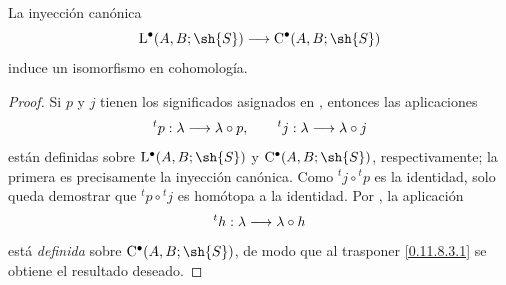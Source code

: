 \documentclass[oneside]{amsart}
\makeatletter
\newcommand{\ega@arrow}[2]{\mathchoice{#1}{#2}{#2}{#2}}
\renewcommand{\to}{\ega@arrow{\longrightarrow}{\rightarrow}}
\let\EGAOriginalLabel\label
\renewcommand{\label}[1]{\phantomsection\EGAOriginalLabel{#1}}
\makeatother
\begin{document}
\begin{proposition}[11.8.5]
\label{0.11.8.5}
La inyección canónica
\[
  \mathrm{L}^\bullet(A,B;\sh{S})
  \longrightarrow
  \mathrm{C}^\bullet(A,B;\sh{S})
\]
induce un isomorfismo en cohomología.
\end{proposition}

\begin{proof}
Si $p$ y $j$ tienen los significados asignados en , entonces
las aplicaciones
\[
  {}^tp:\lambda\to\lambda\circ p,
  \qquad
  {}^tj:\lambda\to\lambda\circ j
\]
están definidas sobre $\mathrm{L}^\bullet(A,B;\sh{S})$ y
$\mathrm{C}^\bullet(A,B;\sh{S})$, respectivamente; la primera es precisamente
la inyección canónica.
Como ${}^tj\circ{}^tp$ es la identidad, solo queda demostrar
que ${}^tp\circ{}^tj$ es homótopa a la identidad.
Por , la aplicación
\[
  {}^th:\lambda\to\lambda\circ h
\]
está \emph{definida} sobre $\mathrm{C}^\bullet(A,B;\sh{S})$, de modo que al trasponer
\eqref{0.11.8.3.1} se obtiene el resultado deseado.
\end{proof}
\end{document}
